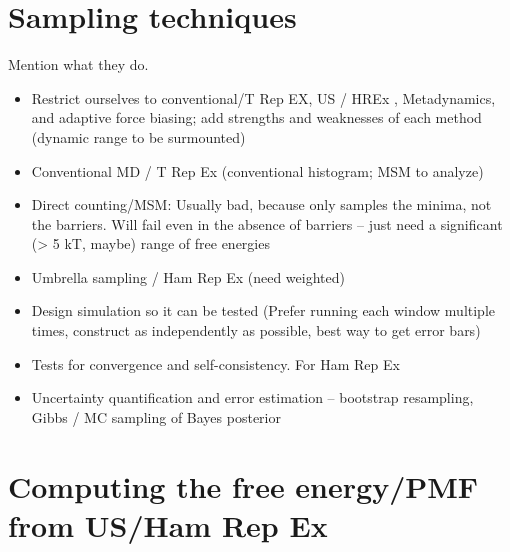 \documentclass[9pt]{livecoms}
\begin{document}
\section{Sampling techniques}

Mention what they do.
\begin{itemize}
\item Restrict ourselves to conventional/T Rep EX, US / HREx , Metadynamics, and adaptive force biasing; add strengths and weaknesses of each method (dynamic range to be surmounted)
\item Conventional MD / T Rep Ex (conventional histogram; MSM to analyze)
\item Direct counting/MSM: Usually bad, because only samples the minima, not the barriers.  Will fail even in the absence of barriers -- just need a significant (> 5 kT, maybe) range of free energies
\item Umbrella sampling / Ham Rep Ex (need weighted)
\item Design simulation so it can be tested (Prefer running each window multiple times, construct as independently as possible, best way to get error bars)
\item Tests for convergence and self-consistency. For Ham Rep Ex\cite{Neale2014}
\item Uncertainty quantification and error estimation -- bootstrap resampling, Gibbs / MC sampling of Bayes posterior
\end{itemize}

\section{Computing the free energy/PMF from US/Ham Rep Ex}

\end{document}
